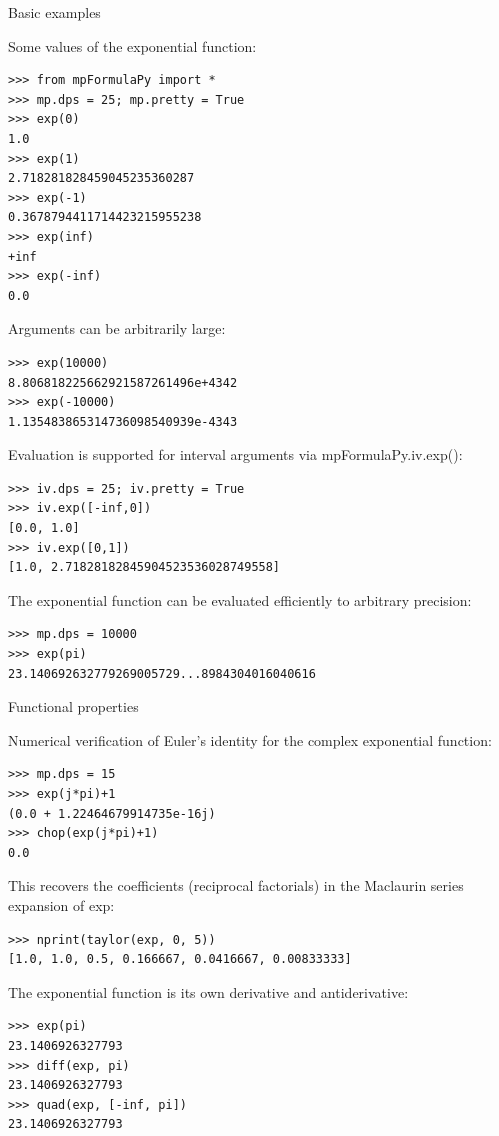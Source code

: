 Basic examples

Some values of the exponential function:
\begin{lstlisting}
>>> from mpFormulaPy import *
>>> mp.dps = 25; mp.pretty = True
>>> exp(0)
1.0
>>> exp(1)
2.718281828459045235360287
>>> exp(-1)
0.3678794411714423215955238
>>> exp(inf)
+inf
>>> exp(-inf)
0.0
\end{lstlisting}



Arguments can be arbitrarily large:
\begin{lstlisting}
>>> exp(10000)
8.806818225662921587261496e+4342
>>> exp(-10000)
1.135483865314736098540939e-4343
\end{lstlisting}



Evaluation is supported for interval arguments via mpFormulaPy.iv.exp():
\begin{lstlisting}
>>> iv.dps = 25; iv.pretty = True
>>> iv.exp([-inf,0])
[0.0, 1.0]
>>> iv.exp([0,1])
[1.0, 2.71828182845904523536028749558]
\end{lstlisting}



The exponential function can be evaluated efficiently to arbitrary precision:
\begin{lstlisting}
>>> mp.dps = 10000
>>> exp(pi)
23.140692632779269005729...8984304016040616
\end{lstlisting}



Functional properties

Numerical verification of Euler's identity for the complex exponential function:
\begin{lstlisting}
>>> mp.dps = 15
>>> exp(j*pi)+1
(0.0 + 1.22464679914735e-16j)
>>> chop(exp(j*pi)+1)
0.0
\end{lstlisting}



This recovers the coefficients (reciprocal factorials) in the Maclaurin series expansion of exp:
\begin{lstlisting}
>>> nprint(taylor(exp, 0, 5))
[1.0, 1.0, 0.5, 0.166667, 0.0416667, 0.00833333]
\end{lstlisting}


The exponential function is its own derivative and antiderivative:
\begin{lstlisting}
>>> exp(pi)
23.1406926327793
>>> diff(exp, pi)
23.1406926327793
>>> quad(exp, [-inf, pi])
23.1406926327793
\end{lstlisting}



